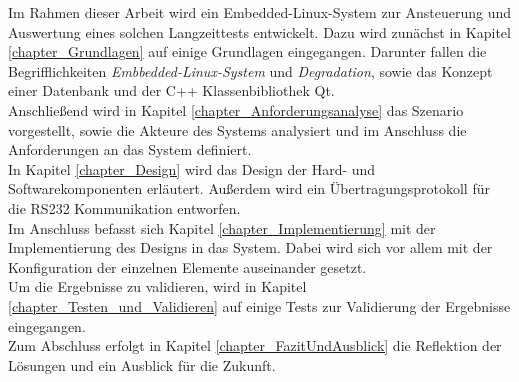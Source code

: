 Im Rahmen dieser Arbeit wird ein Embedded-Linux-System zur Ansteuerung und Auswertung eines solchen Langzeittests entwickelt. Dazu wird zunächst in Kapitel \ref{chapter_Grundlagen} auf einige Grundlagen eingegangen. Darunter fallen die Begrifflichkeiten \textit{Embbedded-Linux-System} und \textit{Degradation}, sowie das Konzept einer Datenbank und der C++ Klassenbibliothek Qt.\\
Anschließend wird in Kapitel \ref{chapter_Anforderungsanalyse} das Szenario vorgestellt, sowie die Akteure des Systems analysiert und im Anschluss die Anforderungen an das System definiert.\\
In Kapitel \ref{chapter_Design} wird das Design der Hard- und Softwarekomponenten erläutert. Außerdem wird ein Übertragungsprotokoll für die RS232 Kommunikation entworfen.\\
Im Anschluss befasst sich Kapitel \ref{chapter_Implementierung} mit der Implementierung des Designs in das System. Dabei wird sich vor allem mit der Konfiguration der einzelnen Elemente auseinander gesetzt.\\
Um die Ergebnisse zu validieren, wird in Kapitel \ref{chapter_Testen_und_Validieren} auf einige Tests zur Validierung der Ergebnisse eingegangen.\\
Zum Abschluss erfolgt in Kapitel \ref{chapter_FazitUndAusblick} die Reflektion der Lösungen und ein Ausblick für die Zukunft.